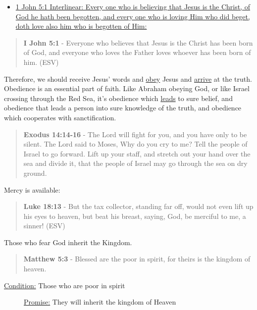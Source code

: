 \documentclass[11pt]{article}
\begin{document}
\begin{itemize}
\item \href{https://biblehub.com/interlinear/1\_john/5-1.htm}{1 John 5:1 Interlinear: Every one who is believing that Jesus is the Christ, of God he hath been begotten, and every one who is loving Him who did beget, doth love also him who is begotten of Him:}
\end{itemize}

\begin{quote}
\textbf{I John 5:1} - Everyone who believes that Jesus is the Christ has been born of God, and everyone who loves the Father loves whoever has been born of him. (ESV)
\end{quote}

Therefore, we should receive Jesus' words and \uline{obey} Jesus and \uline{arrive} at the truth. Obedience is an essential part of faith. Like Abraham obeying God, or like Israel crossing through the Red Sea, it's obedience which \uline{leads} to sure belief, and obedience that leads a person into sure knowledge of the truth, and obedience which cooperates with sanctification.

\begin{quote}
\textbf{Exodus 14:14-16} - The Lord will fight for you, and you have only to be silent.  The Lord said to Moses, Why do you cry to me? Tell the people of Israel to go forward.  Lift up your staff, and stretch out your hand over the sea and divide it, that the people of Israel may go through the sea on dry ground.
\end{quote}

Mercy is available:

\begin{quote}
\textbf{Luke 18:13} - But the tax collector, standing far off, would not even lift up his eyes to heaven, but beat his breast, saying, God, be merciful to me, a sinner! (ESV)
\end{quote}

Those who fear God inherit the Kingdom.

\begin{quote}
\textbf{Matthew 5:3} - Blessed are the poor in spirit, for theirs is the kingdom of heaven.
\end{quote}

\begin{description}
\item[{\uline{Condition:} Those who are poor in spirit}] \uline{Promise:} They will inherit the kingdom of Heaven
\end{description}
\end{document}
